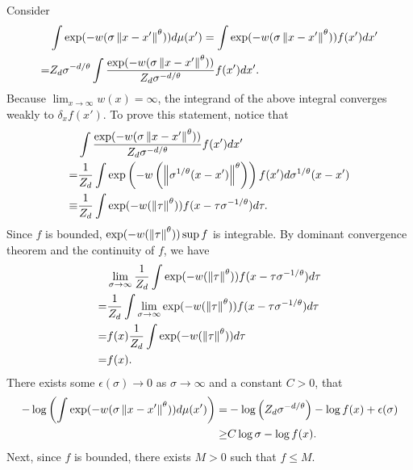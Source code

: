 \documentclass[10pt]{article}
\begin{document}
Consider
\begin{align}
      & \int \exp(-w(\sigma\left\lVert x-x'\right\rVert^{\theta}))d\mu(x') = \int \exp(-w(\sigma\left\lVert x-x'\right\rVert^{\theta})) f(x')dx' \nonumber \\
    = & Z_d \sigma^{-d/\theta}\int \frac{\exp(-w(\sigma\left\lVert x-x'\right\rVert^{\theta}))}{Z_d \sigma^{-d/\theta}} f(x')dx'.
\end{align}
Because $\lim_{x \to \infty} w(x) = \infty$, the integrand of the above integral converges weakly to $\delta_x f(x')$. To prove this statement, notice that
\begin{align}
           & \int \frac{\exp(-w(\sigma\left\lVert x-x'\right\rVert^{\theta}))}{Z_d \sigma^{-d/\theta}} f(x')dx' \nonumber                                          \\
    =      & \frac{1}{Z_d} \int \exp\left(-w \left(\left\lVert\sigma^{1/\theta}(x-x')\right\rVert^{\theta}\right)\right) f(x') d\sigma^{1/\theta}(x-x') \nonumber \\
    \equiv & \frac{1}{Z_d} \int \exp(-w(\left\lVert\tau\right\rVert^{\theta})) f(x-\tau \sigma^{-1/\theta}) d\tau.
\end{align}
Since $f$ is bounded, $\exp(-w(\left\lVert\tau\right\rVert^{\theta})) \sup f$ is integrable. By dominant convergence theorem and the continuity of $f$, we have
\begin{align}
      & \lim_{\sigma \to \infty} \frac{1}{Z_d} \int \exp(-w(\left\lVert\tau\right\rVert^{\theta})) f(x-\tau \sigma^{-1/\theta}) d\tau \nonumber \\
    = & \frac{1}{Z_d} \int \lim_{\sigma \to \infty} \exp(-w(\left\lVert\tau\right\rVert^{\theta})) f(x-\tau \sigma^{-1/\theta}) d\tau \nonumber \\
    = & f(x) \frac{1}{Z_d} \int \exp(-w(\left\lVert\tau\right\rVert^{\theta})) d\tau \nonumber                                                  \\
    = & f(x).
\end{align}
There exists some $\epsilon(\sigma) \to 0$ as $\sigma\to \infty$ and a constant $C>0$, that
\begin{align} \label{big_f_lowerbound_1}
    -\log \left(\int \exp(-w(\sigma\left\lVert x-x'\right\rVert^{\theta}))d\mu(x')\right) = & -\log\left(Z_d \sigma^{-d/\theta}\right) - \log f(x)+ \epsilon(\sigma) \nonumber \\
    \geq                                                                   & C\log \sigma - \log f(x).
\end{align}
Next, since $f$ is bounded, there exists $M>0$ such that $f \leq M$.
\end{document}
